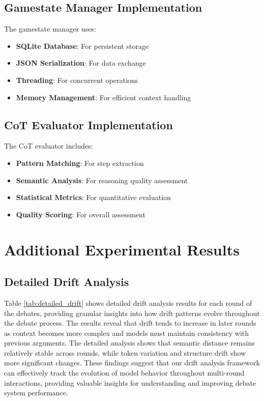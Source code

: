 \documentclass[11pt]{article}
\begin{document}
\subsection{Gamestate Manager Implementation}

The gamestate manager uses:

\begin{itemize}
    \item \textbf{SQLite Database}: For persistent storage
    \item \textbf{JSON Serialization}: For data exchange
    \item \textbf{Threading}: For concurrent operations
    \item \textbf{Memory Management}: For efficient context handling
\end{itemize}

\subsection{CoT Evaluator Implementation}

The CoT evaluator includes:

\begin{itemize}
    \item \textbf{Pattern Matching}: For step extraction
    \item \textbf{Semantic Analysis}: For reasoning quality assessment
    \item \textbf{Statistical Metrics}: For quantitative evaluation
    \item \textbf{Quality Scoring}: For overall assessment
\end{itemize}

\section{Additional Experimental Results}

\subsection{Detailed Drift Analysis}

Table \ref{tab:detailed_drift} shows detailed drift analysis results for each round of the debates, providing granular insights into how drift patterns evolve throughout the debate process. The results reveal that drift tends to increase in later rounds as context becomes more complex and models must maintain consistency with previous arguments. The detailed analysis shows that semantic distance remains relatively stable across rounds, while token variation and structure drift show more significant changes. These findings suggest that our drift analysis framework can effectively track the evolution of model behavior throughout multi-round interactions, providing valuable insights for understanding and improving debate system performance.
\end{document}
